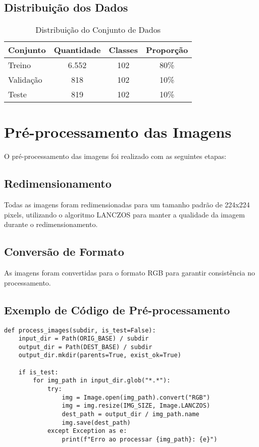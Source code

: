 \documentclass[12pt,a4paper]{article}
\begin{document}
\subsection{Distribuição dos Dados}
\begin{table}[H]
\centering
\caption{Distribuição do Conjunto de Dados}
\begin{tabular}{@{}lccc@{}}
\toprule
\textbf{Conjunto} & \textbf{Quantidade} & \textbf{Classes} & \textbf{Proporção} \\
\midrule
Treino & 6.552 & 102 & 80\% \\
Validação & 818 & 102 & 10\% \\
Teste & 819 & 102 & 10\% \\
\bottomrule
\end{tabular}
\end{table}

\section{Pré-processamento das Imagens}
O pré-processamento das imagens foi realizado com as seguintes etapas:

\subsection{Redimensionamento}
Todas as imagens foram redimensionadas para um tamanho padrão de 224x224 pixels, utilizando o algoritmo LANCZOS para manter a qualidade da imagem durante o redimensionamento.

\subsection{Conversão de Formato}
As imagens foram convertidas para o formato RGB para garantir consistência no processamento.

\subsection{Exemplo de Código de Pré-processamento}
\begin{lstlisting}
def process_images(subdir, is_test=False):
    input_dir = Path(ORIG_BASE) / subdir
    output_dir = Path(DEST_BASE) / subdir
    output_dir.mkdir(parents=True, exist_ok=True)

    if is_test:
        for img_path in input_dir.glob("*.*"):
            try:
                img = Image.open(img_path).convert("RGB")
                img = img.resize(IMG_SIZE, Image.LANCZOS)
                dest_path = output_dir / img_path.name
                img.save(dest_path)
            except Exception as e:
                print(f"Erro ao processar {img_path}: {e}")
\end{lstlisting}
\end{document}
